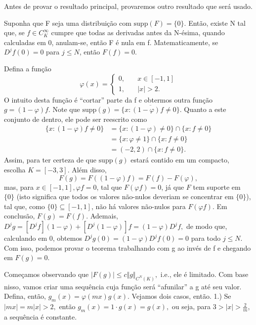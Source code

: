 \documentclass[measure_theory.tex]{subfiles}
\begin{document}
Antes de provar o resultado principal, provaremos outro resultado que será usado.
\begin{prop*}
	Suponha que F seja uma distribuição com \(\mathrm{supp}(F) = \{0\}\). Então, existe N tal que, se \(f\in C_{K}^{\infty}\) cumpre que todas as derivadas antes da N-ésima, quando calculadas em 0, anulam-se, então F é nula em f. Matematicamente, se \(D^{j}f(0) = 0\) para
	\(j\leq N\), então \(F(f) = 0\).
\end{prop*}
\begin{proof*}
	Defina a função
	\[
		\varphi (x) = \left\{\begin{array}{ll}
			0,\quad & x\in [-1, 1] \\
			1,\quad & |x| > 2.
		\end{array}\right.
	\]
	O intuito desta função é ``cortar'' parte da f e obtermos outra função \(g = (1-\varphi )f.\) Note que \(\mathrm{supp}(g) = \overline{\{x: (1-\varphi )f\neq 0\}}.\) Quanto a este conjunto de dentro, ele pode ser reescrito como
	\begin{align*}
		\{x: (1-\varphi )f\neq 0\} & = \{x:(1-\varphi)\neq0\}\cap \{x: f\neq 0\} \\
		                           & = \{x: \varphi \neq 1\}\cap \{x: f\neq 0\}  \\
		                           & = (-2, 2)\cap \{x:f\neq 0\}.
	\end{align*}
	Assim, para ter certeza de que \(\mathrm{supp}(g)\) estará contido em um compacto, escolha \(K = [-3, 3].\) Além disso,
	\[
		F(g) = F((1-\varphi )f) = F(f) - F(\varphi ),
	\]
	mas, para \(x\in [-1, 1], \varphi f = 0\), tal que \(F(\varphi f) = 0\), já que \(F\) tem suporte em \(\{0\}\) (isto significa que todos os valores não-nulos deveriam se concentrar em \(\{0\}\)), tal que, como \(\{0\}\subseteq [-1, 1]\), não há valores não-nulos para \(F(\varphi f).\)
	Em conclusão, \(F(g) = F(f).\) Ademais, \(D^{j}g = [D^{j}f](1-\varphi ) + [D^{j}(1-\varphi )]f = (1-\varphi )D^{j}f,\) de modo que, calculando em 0, obtemos \(D^{j}g(0) = (1-\varphi )D^{j}f(0) = 0\) para todo \(j\leq N\). Com isso, podemos provar o teorema trabalhando com g ao invés de f e chegando em \(F(g) = 0.\)

	Começamos observando que \(|F(g)|\leq c\Vert g \Vert_{C^{N}(K)},\) i.e., ele é limitado. Com base nisso, vamos criar uma sequência cuja função será ``afunilar'' a g até seu valor. Defina, então, \(g_{m}(x)=\varphi (mx)g(x).\) Vejamos dois casos, então.
	1.) Se \(|mx| = m|x| > 2, \) então \(g_{m}(x) = 1 \cdot g(x) = g(x),\) ou seja, para \(3 > |x| >\frac{2}{m}\), a sequência é constante.


\end{proof*}
\end{document}
